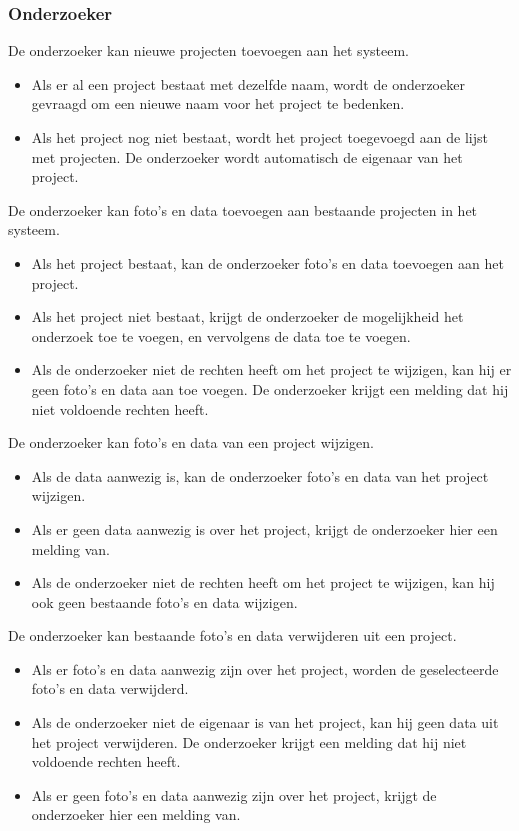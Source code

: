 \subsubsection{Onderzoeker}

De onderzoeker kan nieuwe projecten toevoegen aan het systeem.
\begin{itemize}
	\item Als er al een project bestaat met dezelfde naam, wordt de onderzoeker gevraagd om een nieuwe naam voor het project te bedenken.
	\item Als het project nog niet bestaat, wordt het project toegevoegd aan de lijst met projecten. De onderzoeker wordt automatisch de eigenaar van het project.
\end{itemize}

\noindent
De onderzoeker kan foto's en data toevoegen aan bestaande projecten in het systeem.
\begin{itemize}
	\item Als het project bestaat, kan de onderzoeker foto's en data toevoegen aan het project.
	\item Als het project niet bestaat, krijgt de onderzoeker de mogelijkheid het onderzoek toe te voegen, en vervolgens de data toe te voegen.
	\item Als de onderzoeker niet de rechten heeft om het project te wijzigen, kan hij er geen foto's en data aan toe voegen. De onderzoeker krijgt een melding dat hij niet voldoende rechten heeft.
\end{itemize}

\noindent
De onderzoeker kan foto's en data van een project wijzigen.
\begin{itemize}
	\item Als de data aanwezig is, kan de onderzoeker foto's en data van het project wijzigen.
  \item Als er geen data aanwezig is over het project, krijgt de onderzoeker hier een melding van.
	\item Als de onderzoeker niet de rechten heeft om het project te wijzigen, kan hij ook geen bestaande foto's en data wijzigen.
\end{itemize}

\noindent
De onderzoeker kan bestaande foto's en data verwijderen uit een project.
\begin{itemize}
	\item Als er foto's en data aanwezig zijn over het project, worden de geselecteerde foto's en data verwijderd.
	\item Als de onderzoeker niet de eigenaar is van het project, kan hij geen data uit het project verwijderen. De onderzoeker krijgt een melding dat hij niet voldoende rechten heeft. 
	\item Als er geen foto's en data aanwezig zijn over het project, krijgt de onderzoeker hier een melding van.
\end{itemize}

